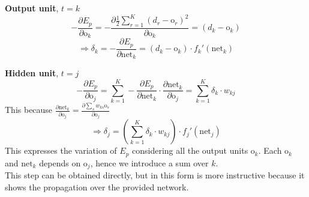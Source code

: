\documentclass[10pt]{report}
\begin{document}
\begin{list}{}{}
	\item \textbf{Output unit}, $t=k$
	$$-\frac{\partial E_p}{\partial \text{o}_k}=-\frac{\partial \frac{1}{2}\sum_{r=1}^K(d_r-\text{o}_r)^2}{\partial\text{o}_k} = (d_k-\text{o}_k)$$ $$\Rightarrow\delta_k = -\frac{\partial E_p}{\partial\text{net}_k}=(d_k-\text{o}_k)\cdot f_k'(\text{net}_k)$$
	\item \textbf{Hidden unit}, $t=j$
	$$-\frac{\partial E_p}{\partial\text{o}_j} = \sum_{k=1}^K -\frac{\partial E_p}{\partial\text{net}_k}\cdot\frac{\partial\text{net}_k}{\partial\text{o}_j}=\sum_{k=1}^K\delta_k\cdot w_{kj}$$
	This because $\frac{\partial\text{net}_k}{\partial\text{o}_j} = \frac{\partial\sum_s w_{ks}\text{o}_s}{\partial\text{o}_j}$
	$$\Rightarrow\delta_j = \left(\sum_{k=1}^K\delta_k\cdot w_{kj}\right)\cdot f_j'(\text{net}_j)$$
	This expresses the variation of $E_p$ considering all the output units $\text{o}_k$. Each $\text{o}_k$ and $\text{net}_k$ depends on $\text{o}_j$, hence we introduce a sum over $k$.\\
	This step can be obtained directly, but in this form is more instructive because it shows the propagation over the provided network.
\end{list}
\end{document}
